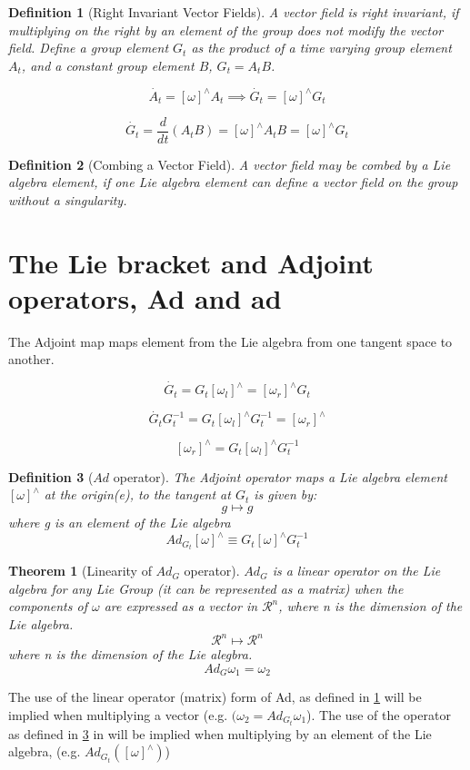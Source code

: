 \documentclass{book}
\newtheorem{definition}{Definition}
\newtheorem{theorem}{Theorem}
\begin{document}
\begin{definition}[Right Invariant Vector Fields]
A vector field is right invariant, if multiplying on the right by an element of the
group does not modify the vector field. Define a group element $G_t$ as the product of a time
varying group element $A_t$, and a constant group element $B$, $G_t = A_t B$.

$$\dot{A_t} = [\omega]^{\wedge} A_t  \implies \dot{G_t} = [\omega]^{\wedge} G_t$$

$$\dot{G_t} = \dfrac{d}{dt} \left(A_t B \right) = [\omega]^{\wedge}  A_t B = [\omega]^{\wedge} G_t$$
\end{definition}

\begin{definition}[Combing a Vector Field]
A vector field may be combed by a Lie algebra element, if one Lie algebra element can 
define a vector field on the group without a singularity.
\end{definition}

\section{The Lie bracket and Adjoint operators, Ad and ad}

The Adjoint map maps element from the Lie algebra from one tangent space to another.

$$\dot{G_t} = G_t [\omega_l]^{\wedge} = [\omega_r]^{\wedge} G_t $$

$$\dot{G_t}  G_t^{-1}  = G_t [\omega_l]^{\wedge} G_t^{-1} = [\omega_r]^{\wedge}$$

$$[\omega_r]^{\wedge} = G_t [\omega_l]^{\wedge} G_t^{-1}$$


\begin{definition}[$Ad$ operator]
The Adjoint operator maps a Lie algebra element $[\omega]^{\wedge}$
at the origin(e), to the tangent at $G_t$ is given by:
$$g \mapsto g$$ where g is an element of the Lie algebra
$$Ad_{G_t}[\omega]^{\wedge} \equiv G_t [\omega]^{\wedge} G_t^{-1}$$
\label{def:Ad}
\end{definition}
%
\begin{theorem} [Linearity of $Ad_G$ operator]
$Ad_G$ is a linear operator on the Lie algebra for any Lie Group (it can be represented as a matrix)
when the components of $\omega$ are expressed as a vector in $\mathcal{R}^n$, where n is the dimension
of the Lie algebra.
$$\mathcal{R}^n \mapsto \mathcal{R}^n$$ where n is the dimension of the Lie alegbra.
$$Ad_G \omega_1 = \omega_2$$
\label{thm:lin_Ad}
\end{theorem}
%
The use of the linear operator (matrix) form of Ad, as defined in \cref{thm:lin_Ad} will
be implied when multiplying a vector (e.g.  $(\omega_2 = Ad_{G_t} \omega_1$). The use of the
operator as defined in \cref{def:Ad} in will be implied when multiplying by an element of the Lie algebra,
(e.g. $Ad_{G_t}\left([\omega]^{\wedge}\right)$)
\end{document}
